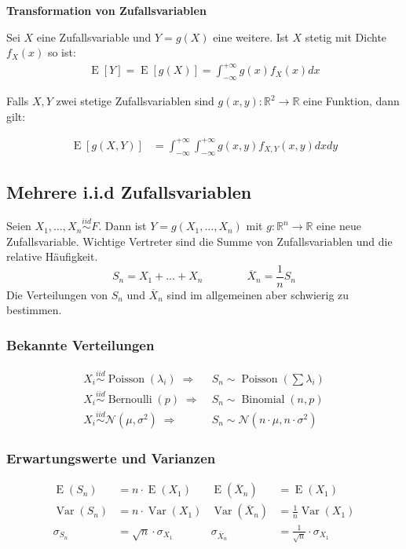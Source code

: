 \documentclass[25pt]{sciposter}
\newcommand{\R}{\mathbb{R}}
\newcommand{\Var}{\operatorname{Var}}
\newcommand{\E}{\operatorname{E}}
\newcommand{\mc}{\mathcal}
\newenvironment{thm}[1]{\begin{mdframed}[backgroundcolor=pink!20,innertopmargin=15pt, innerbottommargin=15pt, nobreak=true]
		\textbf{#1 }
	}
	{ 
	\end{mdframed}
}
\begin{document}
\begin{multicols}{3}
\begin{thm}{Transformation von Zufallsvariablen}
	Sei $X$ eine Zufallsvariable und $Y=g(X)$ eine weitere. Ist $X$ stetig mit Dichte $f_X(x)$ so ist:
	\begin{align*}
		\E[Y] = \E[g(X)] = \int_{-\infty}^{+\infty} g(x) f_X(x) dx
	\end{align*}
	
	Falls $X,Y$ zwei stetige Zufallsvariablen sind $g(x,y) : \R^2 \to \R$ eine Funktion, dann gilt:
	
	\begin{align*}
		\E[g(X,Y)] &= \int_{-\infty}^{+\infty} \int_{-\infty}^{+\infty} g(x,y) f_{X,Y}(x,y) dx dy
	\end{align*}
	
\end{thm}




\subsection*{Mehrere i.i.d Zufallsvariablen}

Seien $X_1,\ldots,X_n \overset{iid}{\sim} F$. Dann ist $Y=g(X_1,\ldots,X_n)$ mit $g: \R^n \longrightarrow \R$ eine neue Zufallsvariable.
Wichtige Vertreter sind die Summe von Zufallsvariablen und die relative Häufigkeit.
\[ S_n = X_1 + \ldots + X_n \qquad \qquad\overline{X}_n = \dfrac{1}{n} S_n \]
Die Verteilungen von $S_n$ und $\overline X_n$ sind im allgemeinen aber schwierig zu bestimmen.

\subsubsection*{Bekannte Verteilungen}
\begin{align*}
X_i \overset{iid}{\sim} \operatorname{Poisson}(\lambda_i) \; \Rightarrow & \; S_n \sim \operatorname{Poisson}({\textstyle \sum \lambda_i}) \\
X_i \overset{iid}{\sim} \operatorname{Bernoulli}(p) \; \Rightarrow & \; S_n \sim \operatorname{Binomial}(n,p)\\
X_i \overset{iid}{\sim} \mc N(\mu, \sigma^2) \; \Rightarrow & \; S_n \sim \mc N(n \cdot \mu, n \cdot \sigma^2)
\end{align*}
\subsubsection*{Erwartungswerte und Varianzen}
\begin{align*}
\E(S_n) &= n \cdot \E(X_1) & \E(\overline{X}_n) &= \E(X_1) \\
\Var(S_n) &= n \cdot \Var(X_1) & \Var(\overline{X}_n) &= \tfrac{1}{n} \Var(X_1) \\
\sigma_{S_n} &= \sqrt{n} \cdot \sigma_{X_1} & \sigma_{\overline{X}_n} &= \tfrac{1}{\sqrt{n}} \cdot \sigma_{X_1}
\end{align*}




\end{multicols}
\end{document}
